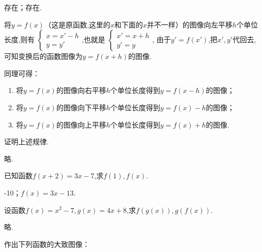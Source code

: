 \documentclass[lang=cn,newtx,10pt,scheme=chinese]{elegantbook}
\begin{document}
\begin{solution}
  存在；存在.
\end{solution}

\begin{exercise}
  将$y=f(x)$（这是原函数,这里的$x$和下面的$x$并不一样）的图像向左平移$h$个单位长度,则有
$\begin{cases}
  x=x'-h
  \\y=y'
\end{cases}$,也就是
$\begin{cases}
  x'=x+h
  \\y'=y
\end{cases}$,
由于$y'=f(x')$,把$x',y'$代回去,可知变换后的函数图像为$y=f(x+h)$的图像.

同理可得：

\begin{enumerate}
  \item 将$y=f(x)$的图像向右平移$h$个单位长度得到$y=f(x-h)$的图像；
  \item 将$y=f(x)$的图像向下平移$h$个单位长度得到$y=f(x)-h$的图像；
  \item 将$y=f(x)$的图像向上平移$h$个单位长度得到$y=f(x)+h$的图像.
\end{enumerate}

  证明上述规律.
\end{exercise}

\begin{solution}
  略.
\end{solution}

\begin{exercise}\label{2017RJB.P94.8.changed}
  已知函数$f(x+2)=3x-7$,求$f(1),f(x)$.
\end{exercise}

\begin{solution}
  -10；$f(x)=3x-13$.
\end{solution}

\begin{exercise}
  设函数$f(x)=x^2-7,g(x)=4x+8$,求$f(g(x)),g(f(x))$.
\end{exercise}

\begin{solution}
  略.
\end{solution}

\begin{exercise}
  作出下列函数的大致图像：
\end{exercise}
\end{document}
